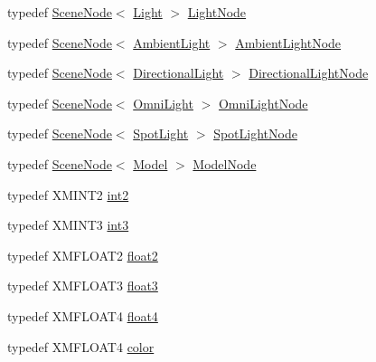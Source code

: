 \begin{DoxyCompactItemize}
\item 
typedef \hyperlink{classmage_1_1_scene_node}{Scene\+Node}$<$ \hyperlink{classmage_1_1_light}{Light} $>$ \hyperlink{namespacemage_a7516e49e86864dbb1196ceed9a11ac6a}{Light\+Node}
\item 
typedef \hyperlink{classmage_1_1_scene_node}{Scene\+Node}$<$ \hyperlink{classmage_1_1_ambient_light}{Ambient\+Light} $>$ \hyperlink{namespacemage_a282fb14928fdd9bf45e8f3fdd2dc6c5d}{Ambient\+Light\+Node}
\item 
typedef \hyperlink{classmage_1_1_scene_node}{Scene\+Node}$<$ \hyperlink{classmage_1_1_directional_light}{Directional\+Light} $>$ \hyperlink{namespacemage_a5e5cbd16a5bf7ca2b7cdf1b0a37b79b4}{Directional\+Light\+Node}
\item 
typedef \hyperlink{classmage_1_1_scene_node}{Scene\+Node}$<$ \hyperlink{classmage_1_1_omni_light}{Omni\+Light} $>$ \hyperlink{namespacemage_a5d71843ded3749108547eba2a5ce4d85}{Omni\+Light\+Node}
\item 
typedef \hyperlink{classmage_1_1_scene_node}{Scene\+Node}$<$ \hyperlink{classmage_1_1_spot_light}{Spot\+Light} $>$ \hyperlink{namespacemage_ab9f49a82dd438032bb38c5436a657335}{Spot\+Light\+Node}
\item 
typedef \hyperlink{classmage_1_1_scene_node}{Scene\+Node}$<$ \hyperlink{classmage_1_1_model}{Model} $>$ \hyperlink{namespacemage_a3086b6de2ec7ebd59d8b0bdc57195760}{Model\+Node}
\item 
typedef X\+M\+I\+N\+T2 \hyperlink{namespacemage_aa22600b49377872988582e782d7b1fcd}{int2}
\item 
typedef X\+M\+I\+N\+T3 \hyperlink{namespacemage_a80c7f9de83dfbbd55bbf339dbcbd99cc}{int3}
\item 
typedef X\+M\+F\+L\+O\+A\+T2 \hyperlink{namespacemage_a536f5856288c280080c9cdf739e85ddc}{float2}
\item 
typedef X\+M\+F\+L\+O\+A\+T3 \hyperlink{namespacemage_aab5dae4b0aaf8129b9e0d651d91d4b38}{float3}
\item 
typedef X\+M\+F\+L\+O\+A\+T4 \hyperlink{namespacemage_aa79484ea5211c29727b3794199ac0a55}{float4}
\item 
typedef X\+M\+F\+L\+O\+A\+T4 \hyperlink{namespacemage_a56eceea5a9bceb2b56073f3ea4945781}{color}
\end{DoxyCompactItemize}
